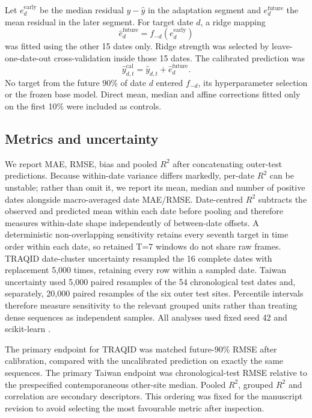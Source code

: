 \documentclass[review,12pt,authoryear]{elsarticle}
\newcommand{\Rtwo}{\ensuremath{R^2}}
\begin{document}
Let $e_d^{\mathrm{early}}$ be the median residual $y-\hat y$ in the adaptation
segment and $e_d^{\mathrm{future}}$ the mean residual in the later segment. For
target date $d$, a ridge mapping
\begin{equation}
 \widehat e_d^{\mathrm{future}} =
 f_{-d}\!\left(e_d^{\mathrm{early}}\right)
 \label{eq:meta}
\end{equation}
was fitted using the other 15 dates only. Ridge strength was selected by
leave-one-date-out cross-validation inside those 15 dates. The calibrated
prediction was
\begin{equation}
 \hat y_{d,t}^{\mathrm{cal}}=\hat y_{d,t}+\widehat e_d^{\mathrm{future}}.
 \label{eq:calibration}
\end{equation}
No target from the future 90\% of date $d$ entered $f_{-d}$, its
hyperparameter selection or the frozen base model. Direct mean, median and
affine corrections fitted only on the first 10\% were included as controls.

\subsection{Metrics and uncertainty}

We report MAE, RMSE, bias and pooled \Rtwo{} after concatenating outer-test
predictions. Because within-date variance differs markedly, per-date \Rtwo{}
can be unstable; rather than omit it, we report its mean, median and number of
positive dates alongside macro-averaged date MAE/RMSE. Date-centred \Rtwo{}
subtracts the observed and predicted mean within each date before pooling and
therefore measures within-date shape independently of between-date offsets.
A deterministic non-overlapping sensitivity retains every seventh target in
time order within each date, so retained T=7 windows do not share raw frames.
TRAQID date-cluster uncertainty resampled the 16 complete dates with replacement
5,000 times, retaining every row within a sampled date. Taiwan uncertainty used
5,000 paired resamples of the 54 chronological test dates and, separately,
20,000 paired resamples of the six outer test sites. Percentile intervals
therefore measure sensitivity to the relevant grouped units rather than treating
dense sequences as independent samples. All analyses used fixed seed 42 and
scikit-learn \citep{pedregosa2011sklearn}.

The primary endpoint for TRAQID was matched future-90\% RMSE after
calibration, compared with the uncalibrated prediction on exactly the same
sequences. The primary Taiwan endpoint was chronological-test RMSE relative to
the prespecified contemporaneous other-site median. Pooled \Rtwo{}, grouped
\Rtwo{} and correlation are secondary descriptors. This ordering was fixed for
the manuscript revision to avoid selecting the most favourable metric after
inspection.
\end{document}
